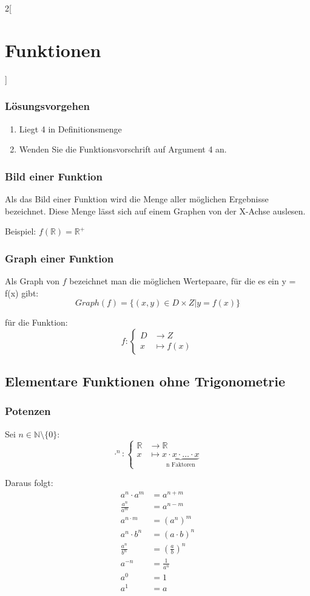 \begin{multicols}{2}[
	\section{Funktionen}
]
\subsubsection{Lösungsvorgehen}
	\begin{enumerate}
		\item Liegt 4 in Definitionsmenge
		\item Wenden Sie die Funktionsvorschrift auf Argument 4 an.
	\end{enumerate}

\subsubsection{Bild einer Funktion}
	Als das Bild einer Funktion wird die Menge aller möglichen Ergebnisse bezeichnet. Diese Menge lässt sich auf einem Graphen von der X-Achse auslesen.
	
	Beispiel: $f(\mathbb{R}) = \mathbb{R}^+$
	
\subsubsection{Graph einer Funktion}
	Als Graph von $f$ bezeichnet man die möglichen Wertepaare, für die es ein y = f(x) gibt:
	\[
		Graph(f) = \{(x,y) \in D \times Z | y=f(x)\}
	\]
	
	für die Funktion: 
	\[
		f:
		\begin{cases}
			D &\to Z \\
			x &\mapsto f(x)
		\end{cases}
	\]

\subsection{Elementare Funktionen ohne Trigonometrie}

\subsubsection{Potenzen}
	Sei $n \in \mathbb{N}\setminus\{0\}$:
	\[
		\cdot^n : \begin{cases}
			\mathbb{R} &\to \mathbb{R} \\
			x &\mapsto \underbrace{x \cdot x \cdot \ldots \cdot x}_\text{n Faktoren}
		\end{cases}
	\]
	
	Daraus folgt:
	\begin{align}
		a^n \cdot a^m &= a ^{n+m} \\
		\frac{a^n}{a^m} &= a^{n-m} \\
		a^{n \cdot m} &= (a^n)^m \\
		a^n \cdot b^n &= (a \cdot b)^n \\
		\frac{a^n}{b^n} &= (\frac{a}{b})^n \\
		a^{-n} &= \frac{1}{a^n} \\
		a^0 &= 1 \\
		a^1 &= a
	\end{align}


\end{multicols}
